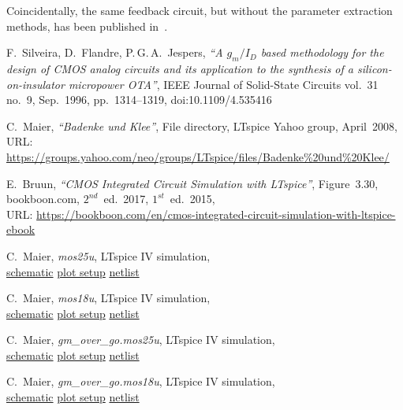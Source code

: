 \documentclass[journal]{IEEEtran}
\begin{document}
Coincidentally, the same feedback circuit, but without the parameter extraction methods, 
has been published in~\cite{Bruun2017}.

\begin{thebibliography}{1}
F.~Silveira, D.~Flandre, P.\,G.\,A.~Jespers,
\textsl{``A $g_m/I_D$ based methodology for the design of CMOS analog circuits and its application to the synthesis of a silicon-on-insulator micropower OTA''},
IEEE Journal of Solid-State Circuits vol.~31 no.~9, Sep.~1996, pp.~1314--1319,
doi:10.1109/4.535416

C.~Maier, \textsl{``Badenke und Klee''}, File directory, LTspice Yahoo group, April~2008,\\
URL: \url{https://groups.yahoo.com/neo/groups/LTspice/files/Badenke\%20und\%20Klee/}

E.~Bruun, \textsl{``CMOS Integrated Circuit Simulation with LTspice''}, Figure~3.30, 
bookboon.com, $2^{nd}$~ed.~2017, $1^{st}$~ed.~2015,\\
URL: \url{https://bookboon.com/en/cmos-integrated-circuit-simulation-with-ltspice-ebook}

C.~Maier, \textsl{mos25u}, LTspice IV simulation,\\ 
\href{https://bitbucket.org/cmucsd/teachingskilldemo/src/master/LTspice/mos25u.asc}{schematic}
\href{https://bitbucket.org/cmucsd/teachingskilldemo/src/master/LTspice/mos25u.plt}{plot setup}
\href{https://bitbucket.org/cmucsd/teachingskilldemo/src/master/LTspice/mos25u.net}{netlist}

C.~Maier, \textsl{mos18u}, LTspice IV simulation,\\ 
\href{https://bitbucket.org/cmucsd/teachingskilldemo/src/master/LTspice/mos18u.asc}{schematic}
\href{https://bitbucket.org/cmucsd/teachingskilldemo/src/master/LTspice/mos18u.plt}{plot setup}
\href{https://bitbucket.org/cmucsd/teachingskilldemo/src/master/LTspice/mos18u.net}{netlist}

C.~Maier, \textsl{gm\_over\_go.mos25u}, LTspice IV simulation,\\ 
\href{https://bitbucket.org/cmucsd/teachingskilldemo/src/master/LTspice/gm_over_go.mos25u.asc}{schematic}
\href{https://bitbucket.org/cmucsd/teachingskilldemo/src/master/LTspice/gm_over_go.mos25u.plt}{plot setup}
\href{https://bitbucket.org/cmucsd/teachingskilldemo/src/master/LTspice/gm_over_go.mos25u.net}{netlist}

C.~Maier, \textsl{gm\_over\_go.mos18u}, LTspice IV simulation,\\ 
\href{https://bitbucket.org/cmucsd/teachingskilldemo/src/master/LTspice/gm_over_go.mos18u.asc}{schematic}
\href{https://bitbucket.org/cmucsd/teachingskilldemo/src/master/LTspice/gm_over_go.mos18u.plt}{plot setup}
\href{https://bitbucket.org/cmucsd/teachingskilldemo/src/master/LTspice/gm_over_go.mos18u.net}{netlist}

\end{thebibliography}
\end{document}
